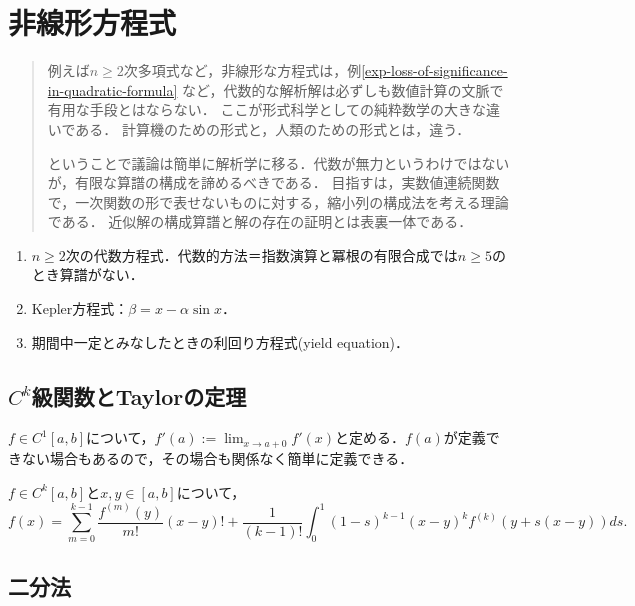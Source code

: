 \documentclass[uplatex, dvipdfmx]{jsreport}
\begin{document}
\chapter{非線形方程式}

\begin{quotation}
    例えば$n\ge 2$次多項式など，非線形な方程式は，例\ref{exp-loss-of-significance-in-quadratic-formula}
    など，代数的な解析解は必ずしも数値計算の文脈で有用な手段とはならない．
    ここが形式科学としての純粋数学の大きな違いである．
    計算機のための形式と，人類のための形式とは，違う．

    ということで議論は簡単に解析学に移る．代数が無力というわけではないが，有限な算譜の構成を諦めるべきである．
    目指すは，実数値連続関数で，一次関数の形で表せないものに対する，縮小列の構成法を考える理論である．
    近似解の構成算譜と解の存在の証明とは表裏一体である．
\end{quotation}

\begin{example}[単独非線型方程式]\mbox{}
    \begin{enumerate}
        \item $n\ge 2$次の代数方程式．代数的方法＝指数演算と冪根の有限合成では$n\ge 5$のとき算譜がない．
        \item Kepler方程式：$\beta=x-\alpha\sin x$．
        \item 期間中一定とみなしたときの利回り方程式(yield equation)．
    \end{enumerate}
\end{example}

\section{$C^k$級関数とTaylorの定理}

\begin{definition}[境界での微分係数は連続補完する]
    $f\in C^1[a,b]$について，$f'(a):=\lim_{x\to a+0}f'(x)$と定める．$f(a)$が定義できない場合もあるので，その場合も関係なく簡単に定義できる．
\end{definition}

\begin{theorem}
    $f\in C^k[a,b]$と$x,y\in [a,b]$について，
    \[f(x)=\sum^{k-1}_{m=0}\frac{f^{(m)}(y)}{m!}(x-y)!+\frac{1}{(k-1)!}\int^1_0(1-s)^{k-1}(x-y)^kf^{(k)}(y+s(x-y))ds.\]
\end{theorem}

\section{二分法}
\end{document}
